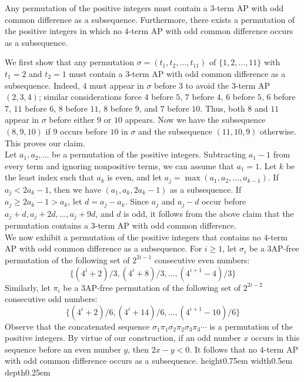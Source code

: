 \documentclass[12pt]{article}
\newcommand{\eop}{\nobreak \ifvmode \relax \else
\ifdim\lastskip<1.5em \hskip-\lastskip
\hskip1.5em plus0em minus0.5em \fi \nobreak
\vrule height0.75em width0.5em depth0.25em\fi}
\begin{document}
\theorem Any permutation of the positive integers must contain a $3$-term 
AP with odd common difference as a subsequence. Furthermore, there exists 
a permutation of the positive integers in which no $4$-term AP with odd 
common difference occurs as a subsequence.

\proof We first show that any permutation
$\sigma=(t_1,t_2,\ldots,t_{11})$ of $\{1,2,\ldots,11\}$ with $t_1=2$ and 
$t_2=1$ must contain a $3$-term AP with odd common difference as a
subsequence. Indeed, $4$ must appear in $\sigma$ before $3$ to avoid the
$3$-term AP $(2,3,4)$; similar considerations force $4$ before $5$, $7$
before $4$, $6$ before $5$, $6$ before $7$, $11$ before $6$, $8$ before
$11$, $8$ before $9$, and $7$ before $10$. Thus, both $8$ and $11$ appear
in $\sigma$ before either $9$ or $10$ appears. Now we have the subsequence
$(8,9,10)$ if $9$ occurs before $10$ in $\sigma$ and the subsequence
$(11,10,9)$ otherwise. This proves our claim. \\

Let $a_1,a_2,\ldots$ be a permutation of the positive integers. Subtracting
$a_1-1$ from every term and ignoring nonpositive terms, we can assume that
$a_1=1$. Let $k$ be
the least index such that $a_k$ is even, and let 
$a_j=\max(a_1,a_2,\ldots,a_{k-1})$. If $a_j < 2a_k - 1$, then we have 
$(a_1,a_k,2a_k-1)$ as a subsequence. If $a_j \ge 2a_k - 1 > a_k$, let 
$d=a_j - a_k$. Since $a_j$ and $a_j-d$ occur before $a_j+d, 
a_j + 2d, \ldots, a_j + 9d$, and $d$ is odd, it follows from the above 
claim that the permutation contains a $3$-term AP with odd common 
difference. \\

We now exhibit a permutation of the positive integers that contains no 
$4$-term AP with odd common difference as a subsequence. For $i \ge 1$, 
let $\sigma_i$ be a 3AP-free permutation of the following set of $2^{2i-1}$
consecutive even numbers: $$\{(4^i+2)/3, (4^i+8)/3, \ldots, 
(4^{i+1}-4)/3\}$$ Similarly, let $\pi_i$ be a 3AP-free permutation of the 
following set of $2^{2i-2}$ consecutive odd numbers: $$\{(4^i+2)/6,
(4^i+14)/6, \ldots, (4^{i+1}-10)/6\}$$ Observe that the concatenated
sequence $\sigma_1 \pi_1 \sigma_2 \pi_2 \sigma_3 \pi_3 \cdots$ is a 
permutation of the positive integers. By virtue of our construction, if an 
odd number $x$ occurs in this sequence before an even number $y$, then $2x 
- y < 0$. It follows that no $4$-term AP with odd common difference occurs 
as a subsequence. \eop \\
\end{document}
